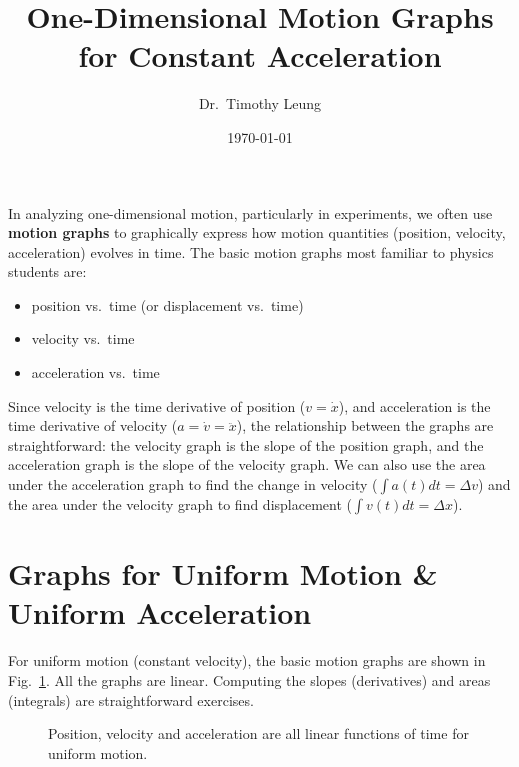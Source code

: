 \documentclass{../../../oss-handout}
\title{One-Dimensional Motion Graphs for Constant Acceleration}
\author{Dr.\ Timothy Leung}
\date{\today}
\begin{document}
\thispagestyle{title}
\gentitle

In analyzing one-dimensional motion, particularly in experiments, we often use
\textbf{motion graphs} to graphically express how motion quantities (position,
velocity, acceleration) evolves in time. The basic motion graphs most familiar
to physics students are:
\begin{itemize}[noitemsep,topsep=0pt,leftmargin=15pt]
\item position vs.\ time (or displacement vs.\ time)
\item velocity vs.\ time
\item acceleration vs.\ time
\end{itemize}
Since velocity is the time derivative of position ($v=\dot{x}$), and
acceleration is the time derivative of velocity ($a=\dot{v}=\ddot{x}$), the
relationship between the graphs are straightforward: the velocity graph is the
slope of the position graph, and the acceleration graph is the slope of the
velocity graph. We can also use the area under the acceleration graph to find
the change in velocity ($\int a(t)dt=\Delta v$) and the area under the velocity
graph to find displacement ($\int v(t)dt=\Delta x$).

\section{Graphs for Uniform Motion \& Uniform Acceleration}
For uniform motion (constant velocity), the basic motion graphs are shown in
Fig.~\ref{uniform-motion}. All the graphs are linear. Computing the slopes
(derivatives) and areas (integrals) are straightforward exercises.
\begin{figure}[!ht]
  \centering
  \hspace{.15in}
  \hspace{.15in}
  \caption{Position, velocity and acceleration are all linear functions of time
    for uniform motion.}
  \label{uniform-motion}
\end{figure}
\end{document}

